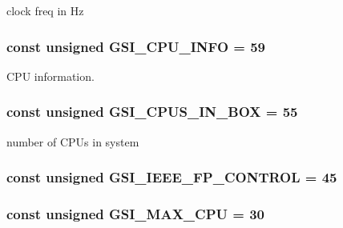 clock freq in Hz \hypertarget{classAlphaLinux_ad89f91e0925845385f177d93e4ef7985}{
\subsubsection[{GSI\_\-CPU\_\-INFO}]{\setlength{\rightskip}{0pt plus 5cm}const unsigned {\bf GSI\_\-CPU\_\-INFO} = 59}}
\label{classAlphaLinux_ad89f91e0925845385f177d93e4ef7985}


CPU information. \hypertarget{classAlphaLinux_a4df912c77419619f6f242873f65b0045}{
\subsubsection[{GSI\_\-CPUS\_\-IN\_\-BOX}]{\setlength{\rightskip}{0pt plus 5cm}const unsigned {\bf GSI\_\-CPUS\_\-IN\_\-BOX} = 55}}
\label{classAlphaLinux_a4df912c77419619f6f242873f65b0045}


number of CPUs in system \hypertarget{classAlphaLinux_a8e5f505720dffbfd8b8bd0ed4d95cdb1}{
\subsubsection[{GSI\_\-IEEE\_\-FP\_\-CONTROL}]{\setlength{\rightskip}{0pt plus 5cm}const unsigned {\bf GSI\_\-IEEE\_\-FP\_\-CONTROL} = 45}}
\label{classAlphaLinux_a8e5f505720dffbfd8b8bd0ed4d95cdb1}
\hypertarget{classAlphaLinux_a14ed8f49156face38fb0dee35125148d}{
\subsubsection[{GSI\_\-MAX\_\-CPU}]{\setlength{\rightskip}{0pt plus 5cm}const unsigned {\bf GSI\_\-MAX\_\-CPU} = 30}}
\label{classAlphaLinux_a14ed8f49156face38fb0dee35125148d}


